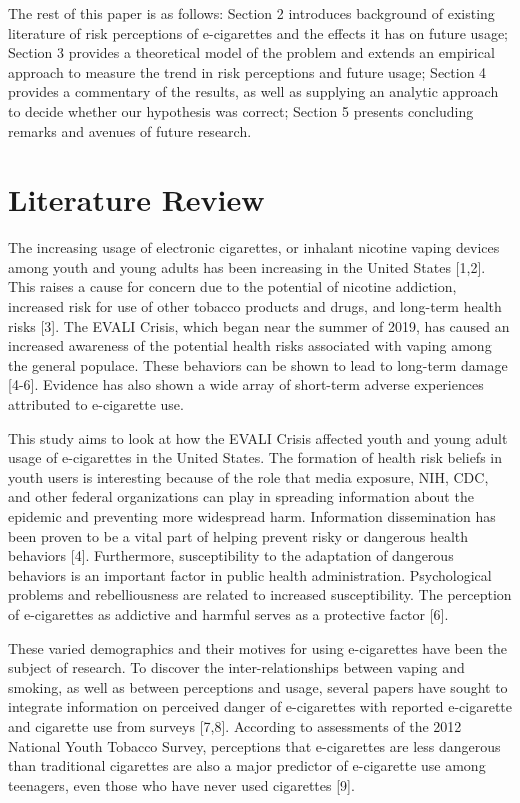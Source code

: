 \documentclass[12pt]{article}
\begin{document}
The rest of this paper is as follows: Section 2 introduces background of existing literature of risk perceptions of e-cigarettes and the effects it has on future usage; Section 3 provides
a theoretical model of the problem and extends an empirical approach to measure the trend in risk perceptions and future usage; Section 4 provides a commentary of the results, as well as supplying an analytic approach to decide whether our hypothesis was correct; Section 5 presents concluding remarks and avenues of future research.


\section{Literature Review} \label{sec:literature}

\hspace{5mm}The increasing usage of electronic cigarettes, or inhalant nicotine vaping devices among youth and young adults has been increasing in the United States [1,2]. This raises a cause for concern due to the potential of nicotine addiction, increased risk for use of other tobacco products and drugs, and long-term health risks [3]. The EVALI Crisis, which began near the summer of 2019, has caused an increased awareness of the potential health risks associated with vaping among the general populace. These behaviors can be shown to lead to long-term damage [4-6]. Evidence has also shown a wide array of short-term adverse experiences attributed to e-cigarette use.

This study aims to look at how the EVALI Crisis affected youth and young adult usage of e-cigarettes in the United States.  The formation of health risk beliefs in youth users is interesting because of the role that media exposure, NIH, CDC, and other federal organizations can play in spreading information about the epidemic and preventing more widespread harm. Information dissemination has been proven to be a vital part of helping prevent risky or dangerous health behaviors [4]. Furthermore, susceptibility to the adaptation of dangerous behaviors is an important factor in public health administration. Psychological problems and rebelliousness are related to increased susceptibility. The perception of e-cigarettes as addictive and harmful serves as a protective factor [6].

These varied demographics and their motives for using e-cigarettes have been the subject of research. To discover the inter-relationships between vaping and smoking, as well as between perceptions and usage, several papers have sought to integrate information on perceived danger of e-cigarettes with reported e-cigarette and cigarette use from surveys [7,8]. According to assessments of the 2012 National Youth Tobacco Survey, perceptions that e-cigarettes are less dangerous than traditional cigarettes are also a major predictor of e-cigarette use among teenagers, even those who have never used cigarettes [9]. 
\end{document}
